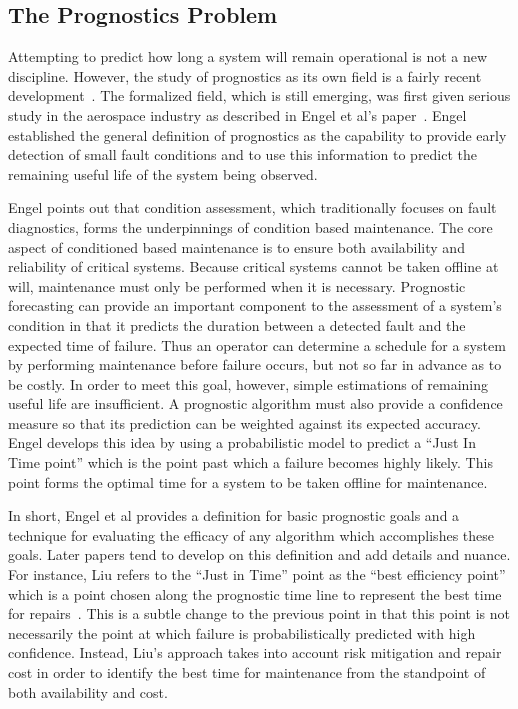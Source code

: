 \documentclass[12pt]{article}
\begin{document}
\subsection{The Prognostics Problem}
Attempting to predict how long a system will remain operational is
not a new discipline.  However, the study of prognostics as its own field is a
fairly recent development~\cite{877920}.  The formalized field, which is still
emerging, was first given serious study in the aerospace industry as described
in Engel et al's paper~\cite{877920}.  Engel established the general
definition of prognostics as the capability to provide early detection of small
fault conditions and to use this information to predict the remaining useful
life of the system being observed.  

Engel points out that condition assessment, which traditionally focuses on
fault diagnostics, forms the underpinnings of condition based maintenance.  The
core aspect of conditioned based maintenance is to ensure both availability
and reliability of critical systems.  Because critical systems cannot be taken
offline at will, maintenance must only be performed when it is necessary.
Prognostic forecasting can provide an important component to the assessment of a
system's condition in that it predicts the duration between a detected fault
and the expected time of failure.  Thus an operator can determine a schedule
for a system by performing maintenance before failure occurs, but not so far in
advance as to be costly.  In order to meet this goal, however, simple
estimations of remaining useful life are insufficient.  A prognostic algorithm
must also provide a confidence measure so that its prediction can be
weighted against its expected accuracy.  Engel develops this idea by using a
probabilistic model to predict a ``Just In Time point'' which is the point
past which a failure becomes highly likely.  This point forms the optimal time
for a system to be taken offline for maintenance.  

In short, Engel et al provides a definition for basic prognostic goals and a
technique for evaluating the efficacy of any algorithm which accomplishes these
goals.  Later papers tend to develop on this definition and add details and
nuance.  For instance, Liu refers to the ``Just in Time'' point as the ``best
efficiency point'' which is a point chosen along the prognostic time line to
represent the best time for repairs~\cite{4585821}.  This is a subtle change to
the previous point in that this point is not necessarily the point at which
failure is probabilistically predicted with high confidence.  Instead, Liu's
approach takes into account risk mitigation and repair cost in order to identify
the best time for maintenance from the standpoint of both availability and cost.
\end{document}
